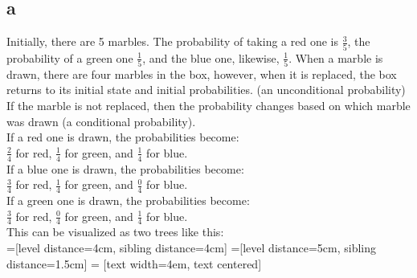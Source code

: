 \documentclass[12pt]{article}
\begin{document}
\subsection*{a}
Initially, there are 5 marbles. The probability of taking a red one is \(\frac{3}{5}\), the probability of a green one \(\frac{1}{5}\), and the blue one, likewise, \(\frac{1}{5}\). When a marble is drawn, there are four marbles in the box, however, when it is replaced, the box returns to its initial state and initial probabilities. (an unconditional probability) If the marble is not replaced, then the probability changes based on which marble was drawn (a conditional probability).\\
If a red one is drawn, the probabilities become:\\
\(\frac{2}{4}\) for red, \(\frac{1}{4}\) for green, and \(\frac{1}{4}\) for blue.\\
If a blue one is drawn, the probabilities become:\\
\(\frac{3}{4}\) for red, \(\frac{1}{4}\) for green, and \(\frac{0}{4}\) for blue.\\
If a green one is drawn, the probabilities become:\\
\(\frac{3}{4}\) for red, \(\frac{0}{4}\) for green, and \(\frac{1}{4}\) for blue.\\
This can be visualized as two trees like this:\\
=[level distance=4cm, sibling distance=4cm]
=[level distance=5cm, sibling distance=1.5cm]
 = [text width=4em, text centered]
\end{document}
